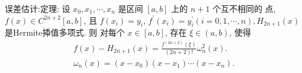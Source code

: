 \documentclass[12pt, a4paper, oneside]{ctexart}
\begin{document}
误差估计:定理: 设 $x_0, x_1, \cdots, x_n$ 是区间 $[a, b]$ 上的 $n+1$ 个互不相同的 点, $f(x) \in C^{2 n+2}[a, b]$, 且 $f\left(x_i\right)=y_i$,
$f^{\prime}\left(x_i\right)=y_i^{\prime}(i=0,1, \cdots, n), H_{2 n+1}(x)$ 是Hermite揷值多项式. 则 对每个 $x \in[a, b]$, 存在 $\xi \in(a, b)$, 使得
$$
\begin{gathered}
f(x)-H_{2 n+1}(x)=\frac{f^{(2 n+2)}(\xi)}{(2 n+2) !} \omega_n^2(x) . \\
\omega_n(x)=\left(x-x_0\right)\left(x-x_1\right) \cdots\left(x-x_n\right) .
\end{gathered}
$$
























% 
% 
\end{document}
